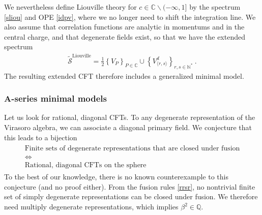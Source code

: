 \documentclass[12pt, a4paper]{article}
\theoremstyle{break}
\begin{document}
We nevertheless define Liouville theory for $c\in\mathbb{C}\backslash (-\infty,1]$ by the spectrum \eqref{sliou} and OPE \eqref{idpv}, where we no longer need to shift the integration line. 
We also assume that correlation functions are analytic in momentums and in the central charge, and that degenerate fields exist, so that we have the extended spectrum
\begin{align}
 \boxed{ \widetilde{\mathcal{S}}^\text{Liouville} = \frac12 \left\{ V_P\right\}_{P\in \mathbb{C}} \cup \left\{ V^d_{\langle r,s\rangle}\right\}_{r,s\in\mathbb{N}^*} }\ .
 \label{stliou}
\end{align}
The resulting extended CFT therefore includes a generalized minimal model. 


\subsubsection{A-series minimal models}\label{sec:amm}

Let us look for rational, diagonal CFTs. 
To any degenerate representation of the Virasoro algebra, we can associate a diagonal primary field. We conjecture that this leads to a bijection 
\begin{align}
\begin{array}{c}
 \text{Finite sets of degenerate representations that are closed under fusion}
 \\
 \iff 
 \\
 \text{Rational, diagonal CFTs on the sphere}
\end{array}
\end{align}
To the best of our knowledge, there is no known counterexample to this conjecture (and no proof either). 
From the fusion rules \eqref{rrsr}, no nontrivial finite set of simply degenerate representations can be closed under fusion. We therefore need multiply degenerate representations, which implies $\beta^2\in\mathbb{Q}$.  
\end{document}
